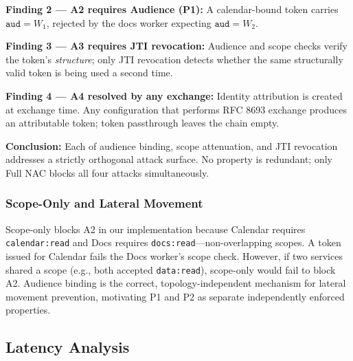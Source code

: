 \documentclass[journal]{IEEEtran}
\begin{document}
\textbf{Finding 2 — A2 requires Audience (P1):} A calendar-bound token carries
$\texttt{aud}=W_1$, rejected by the docs worker expecting $\texttt{aud}=W_2$.

\textbf{Finding 3 — A3 requires JTI revocation:} Audience and scope checks
verify the token's \textit{structure}; only JTI revocation detects whether the
same structurally valid token is being used a second time.

\textbf{Finding 4 — A4 resolved by any exchange:} Identity attribution is
created at exchange time. Any configuration that performs RFC 8693 exchange
produces an attributable token; token passthrough leaves the chain empty.

\textbf{Conclusion:} Each of audience binding, scope attenuation, and JTI
revocation addresses a strictly orthogonal attack surface. No property is
redundant; only Full NAC blocks all four attacks simultaneously.

\subsubsection{Scope-Only and Lateral Movement}
\label{sec:scope_caveat}
Scope-only blocks A2 in our implementation because Calendar requires
\texttt{calendar:read} and Docs requires \texttt{docs:read}---non-overlapping
scopes. A token issued for Calendar fails the Docs worker's scope check.
However, if two services shared a scope (e.g., both accepted \texttt{data:read}),
scope-only would fail to block A2. Audience binding is the correct,
topology-independent mechanism for lateral movement prevention, motivating P1
and P2 as separate independently enforced properties.

\subsection{Latency Analysis}
\end{document}
